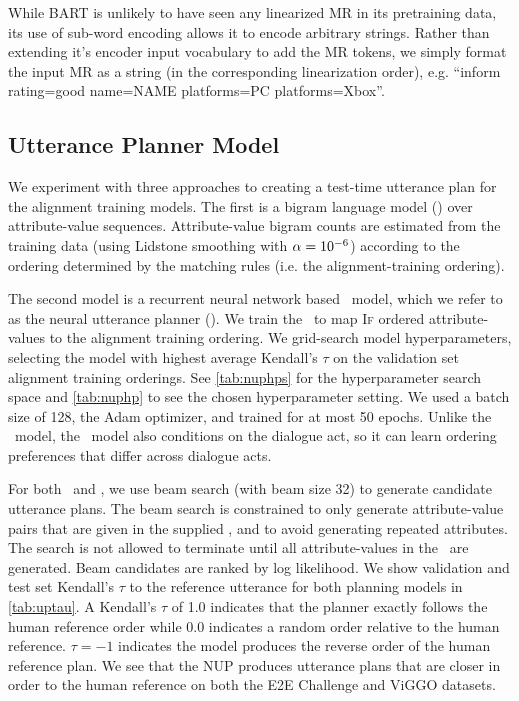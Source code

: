 While BART is unlikely to have seen any linearized MR in its pretraining data,
its use of sub-word encoding  allows it to encode arbitrary strings. Rather
than extending it's encoder input vocabulary to add the MR tokens, we simply
format the input MR as a string (in the corresponding linearization order),
e.g. ``inform rating=good name=NAME platforms=PC platforms=Xbox''.

\subsection{Utterance Planner Model} We experiment with three approaches to
creating a test-time utterance plan for the alignment training models. The
first is a bigram language model (\BgUP) over attribute-value sequences.
Attribute-value bigram counts are estimated from the training data (using
Lidstone smoothing \citep{chen1996} with $\alpha=10^{-6}$)  according to the
ordering determined by the matching rules (i.e. the alignment-training
ordering). 





The second model is a recurrent neural network based \sequencetosequence~model,
which we refer to as the neural utterance planner (\NUP). We train the \NUP~to
map \textsc{If} ordered attribute-values to the alignment training ordering. We
grid-search model hyperparameters, selecting the model with highest average
Kendall's $\tau$ \citep{kendall1938} on the validation set alignment training
orderings. See \autoref{tab:nuphps} for the hyperparameter search space and
\autoref{tab:nuphp} to see the chosen hyperparameter setting. We used a batch
size of 128, the Adam optimizer, and trained for at most 50 epochs.   Unlike
the \BgUP~model, the \NUP~model also conditions on the dialogue act, so it can
learn ordering preferences that differ across dialogue acts.

For both \BgUP~and \NUP, we use beam search (with beam size 32) to generate
candidate utterance plans. The beam search is constrained to only generate
attribute-value pairs that are given in the supplied \meaningrepresentation,
and to avoid generating repeated attributes. The search is not allowed to
terminate until all attribute-values in the \meaningrepresentation~are
generated.  Beam candidates are ranked by log likelihood. We show validation
and test set Kendall's $\tau$ to the reference utterance for both planning
models in \autoref{tab:uptau}.  A Kendall's $\tau$ of 1.0 indicates that the
planner exactly follows the human reference order while 0.0 indicates a random
order relative to the human reference. $\tau=-1$ indicates the model produces
the reverse order of the human reference plan. We see that the NUP produces
utterance plans that are closer in order to the human reference on both the E2E
Challenge and ViGGO datasets.


